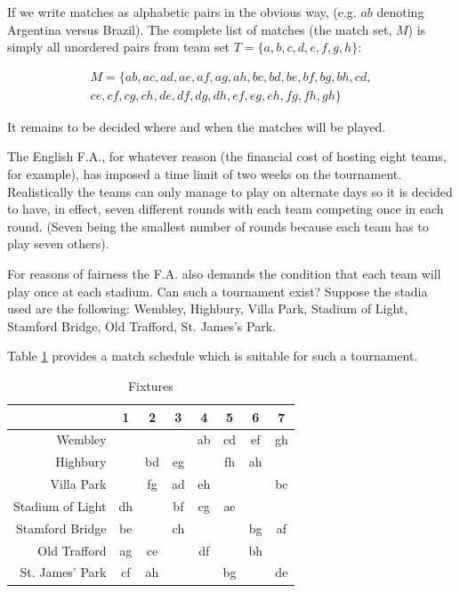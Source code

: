 \documentclass[11pt, a4paper]{book}\usepackage[]{graphicx}\usepackage[]{xcolor}
\newcounter{example}
\begin{document}
If we write matches as alphabetic pairs in the obvious way, (e.g. $ab$ denoting Argentina versus Brazil).
The complete list of matches (the match set, $M$) is simply all unordered pairs from team set $T = \{a, b, c, d, e, f, g, h\}$:

\begin{equation*}
  \begin{split}
    M = \{
      ab, ac, ad, ae, af, ag, ah, bc, bd, be, bf, bg, bh, cd, \\
      ce, cf, cg, ch, de, df, dg, dh, ef, eg, eh, fg, fh, gh
    \}
  \end{split}
\end{equation*}

It remains to be decided where and when the matches will be played.

The English F.A., for whatever reason (the financial cost of hosting eight teams, for example), has imposed a time limit of two weeks on the tournament.
Realistically the teams can only manage to play on alternate days so it is decided to have, in effect, seven different rounds with each team competing once in each round.
(Seven being the smallest number of rounds because each team has to play seven others).

For reasons of fairness the F.A. also demands the condition that each team will play once at each stadium.
Can such a tournament exist?
Suppose the stadia used are the following: Wembley, Highbury, Villa Park, Stadium of Light, Stamford Bridge, Old Trafford, St. James's Park.

Table \ref{tab:fixtures} provides a match schedule which is suitable for such a tournament.

\begin{table}[h!]
  \begin{center}
    \begin{tabular}{r|ccccccc}
                       & 1  &  2 &  3 &  4 &  5 &  6 &  7 \\ \hline
               Wembley &    &    &    & ab & cd & ef & gh \\
              Highbury &    & bd & eg &    & fh & ah &    \\
            Villa Park &    & fg & ad & eh &    &    & bc \\
      Stadium of Light & dh &    & bf & cg & ae &    &    \\
       Stamford Bridge & be &    & ch &    &    & bg & af \\
          Old Trafford & ag & ce &    & df &    & bh &    \\
       St. James' Park & cf & ah &    &    & bg &    & de
    \end{tabular}
  \end{center}
  \caption{Fixtures}
  \label{tab:fixtures}
\end{table}
\end{document}
